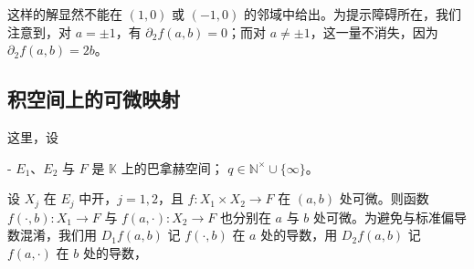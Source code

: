 
这样的解显然不能在 $ (1,0) $ 或 $ (-1,0) $ 的邻域中给出。为提示障碍所在，我们注意到，对 $ a=\pm 1 $，有 $ \partial_{2}f(a,b)=0 $；而对 $ a\ne\pm 1 $，这一量不消失，因为 $ \partial_{2}f(a,b)=2b $。

\subsection*{积空间上的可微映射}

这里，设

- $ E_{1} $、$ E_{2} $ 与 $ F $ 是 $ \mathbb{K} $ 上的巴拿赫空间；
  $ q\in\mathbb{N}^{\times}\cup\{\infty\} $。

设 $ X_{j} $ 在 $ E_{j} $ 中开，$ j=1,2 $，且 $ f:X_{1}\times X_{2}\to F $ 在 $ (a,b) $ 处可微。则函数 $ f(\cdot,b):X_{1}\to F $ 与 $ f(a,\cdot):X_{2}\to F $ 也分别在 $ a $ 与 $ b $ 处可微。为避免与标准偏导数混淆，我们用 $ D_{1}f(a,b) $ 记 $ f(\cdot,b) $ 在 $ a $ 处的导数，用 $ D_{2}f(a,b) $ 记 $ f(a,\cdot) $ 在 $ b $ 处的导数，

